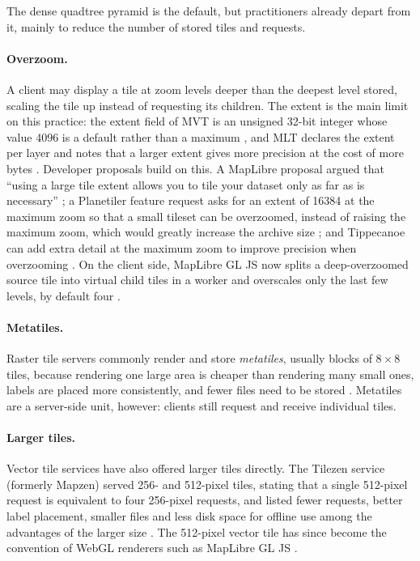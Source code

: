 The dense quadtree pyramid is the default, but practitioners already depart from it,
mainly to reduce the number of stored tiles and requests.

\paragraph{Overzoom.} A client may display a tile at zoom levels deeper than the deepest
level stored, scaling the tile up instead of requesting its children. The extent is the
main limit on this practice: the extent field of MVT is an unsigned 32-bit integer whose
value 4096 is a default rather than a maximum \citep{mapbox_mvt_spec_2_1}, and MLT
declares the extent per layer and notes that a larger extent gives more precision at the
cost of more bytes \citep{maplibre_mlt_overview}. Developer proposals build on this.
A MapLibre proposal argued that ``using a large tile extent allows you to tile your
dataset only as far as is necessary'' \citep{maplibre_gljs_2507}; a Planetiler feature
request asks for an extent of 16384 at the maximum zoom so that a small tileset can be
overzoomed, instead of raising the maximum zoom, which would greatly increase the archive
size \citep{planetiler_1286}; and Tippecanoe can add extra detail at the maximum zoom to
improve precision when overzooming \citep{tippecanoe}. On the client side, MapLibre GL JS
now splits a deep-overzoomed source tile into virtual child tiles in a worker and
overscales only the last few levels, by default four \citep{maplibre_gljs_mapoptions}.

\paragraph{Metatiles.} Raster tile servers commonly render and store \emph{metatiles},
usually blocks of $8\times8$ tiles, because rendering one large area is cheaper than
rendering many small ones, labels are placed more consistently, and fewer files need to
be stored \citep{osm_wiki_metatiles}. Metatiles are a server-side unit, however: clients
still request and receive individual tiles.

\paragraph{Larger tiles.} Vector tile services have also offered larger tiles directly.
The Tilezen service (formerly Mapzen) served 256- and 512-pixel tiles, stating that
a single 512-pixel request is equivalent to four 256-pixel requests, and listed fewer
requests, better label placement, smaller files and less disk space for offline use
among the advantages of the larger size \citep{tilezen_service}. The 512-pixel vector
tile has since become the convention of WebGL renderers such as MapLibre GL JS
\citep{maplibre_gljs_vectorsource}.

